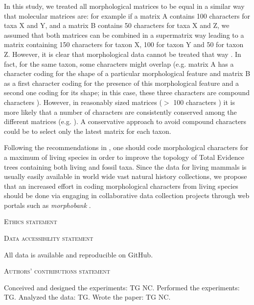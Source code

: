 \documentclass[12pt,letterpaper]{article}
\renewcommand{\section}[1]{%
\bigskip
\begin{center}
\begin{Large}
\normalfont\scshape #1
\medskip
\end{Large}
\end{center}}
\begin{document}
In this study, we treated all morphological matrices to be equal in a similar way that molecular matrices are: for example if a matrix A contains 100 characters for taxa X and Y, and a matrix B contains 50 characters for taxa X and Z, we assumed that both matrices can be combined in a supermatrix way leading to a matrix containing 150 characters for taxon X, 100 for taxon Y and 50 for taxon Z. However, it is clear that morphological data cannot be treated that way \cite{Brazeau2011}. In fact, for the same taxon, some characters might overlap (e.g. matrix A has a character coding for the shape of a particular morphological feature and matrix B as a first character coding for the presence of this morphological feature and a second one coding for its shape; in this case, these three characters are compound characters \cite{Brazeau2011}). However, in reasonably sized matrices ($>$ 100 characters \cite{GuillermeCooper,harrisonamong-character2014}) it is more likely that a number of characters are consistently conserved among the different matrices (e.g. \cite{ross1998phylogenetic,seiffert2003fossil,marivaux2005anthropoid,seiffert2005basal,bloch2007new,kay2008anatomy,silcox2008biogeographic,seiffert2009convergent,tabuce2009anthropoid,boyer2010astragalar,seiffert2010fossil,marivaux2013djebelemur,ni2013oldest}). A conservative approach to avoid compound characters could be to select only the latest matrix for each taxon.

Following the recommendations in \cite{GuillermeCooper}, one should code morphological characters for a maximum of living species in order to improve the topology of Total Evidence trees containing both living and fossil taxa. Since the data for living mammals is usually easily available in world wide vast natural history collections, we propose that an increased effort in coding morphological characters from living species should be done via engaging in collaborative data collection projects through web portals such as \textit{morphobank} \cite{morphobank}.

\section{Ethics statement}
\section{Data accessibility statement}
All data is available and reproducible on GitHub.
\section{Authors’ contributions statement}
Conceived and designed the experiments: TG NC. Performed the experiments: TG. Analyzed the data: TG. Wrote the paper: TG NC.
\end{document}
